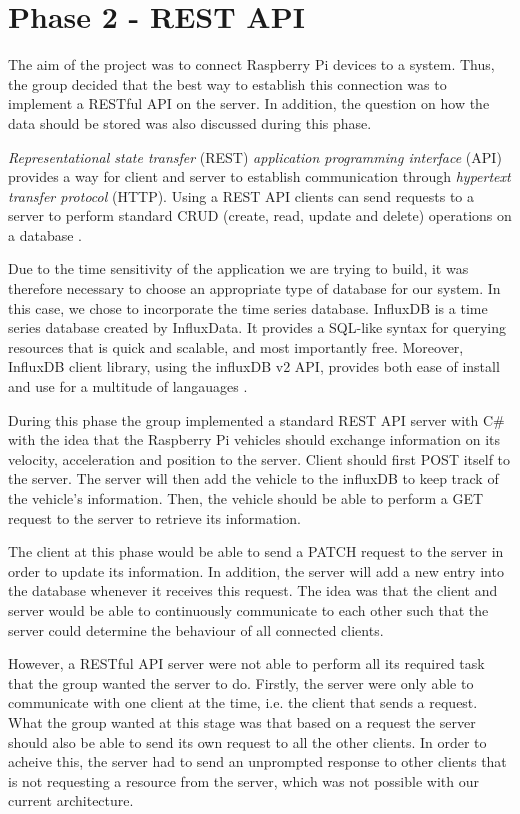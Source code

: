 \section{Phase 2 - REST API}\label{phase2}
The aim of the project was to connect Raspberry Pi devices to a system. Thus, the group decided that the best way to establish this connection was to implement a RESTful API on the server. In addition, the question on how the data should be stored was also discussed during this phase.

\emph{Representational state transfer} (REST) \emph{application programming interface} (API) provides a way for client and server to establish communication through \emph{hypertext transfer protocol} (HTTP). Using a REST API clients can send requests to a server to perform standard CRUD (create, read, update and delete) operations on a database \parencite{rest_api}.

Due to the time sensitivity of the application we are trying to build, it was therefore necessary to choose an appropriate type of database for our system. In this case, we chose to incorporate the time series database. InfluxDB is a time series database created by InfluxData. It provides a SQL-like syntax for querying resources that is quick and scalable, and most importantly free. Moreover, InfluxDB client library, using the influxDB v2 API, provides both ease of install and use for a multitude of langauages \parencite{influxdb}.

During this phase the group implemented a standard REST API server with C\# with the idea that the Raspberry Pi vehicles should exchange information on its velocity, acceleration and position to the server. Client should first POST itself to the server. The server will then add the vehicle to the influxDB to keep track of the vehicle's information. Then, the vehicle should be able to perform a GET request to the server to retrieve its information.

The client at this phase would be able to send a PATCH request to the server in order to update its information. In addition, the server will add a new entry into the database whenever it receives this request. The idea was that the client and server would be able to continuously communicate to each other such that the server could determine the behaviour of all connected clients.

However, a RESTful API server were not able to perform all its required task that the group wanted the server to do. Firstly, the server were only able to communicate with one client at the time, i.e. the client that sends a request. What the group wanted at this stage was that based on a request the server should also be able to send its own request to all the other clients. In order to acheive this, the server had to send an unprompted response to other clients that is not requesting a resource from the server, which was not possible with our current architecture.

